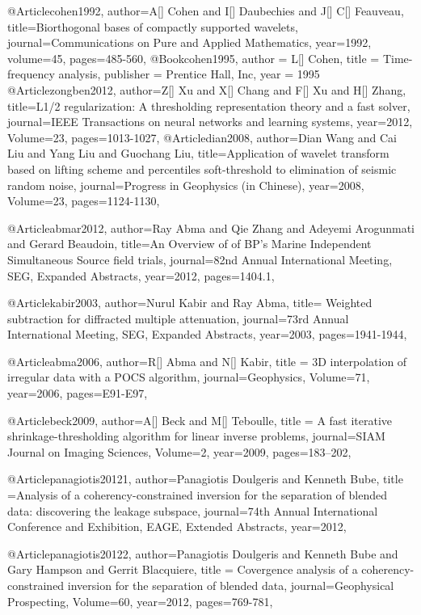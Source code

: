 @Article{cohen1992,
  author={A[] Cohen and I[] Daubechies and J[] C[] Feauveau},
  title={Biorthogonal bases of compactly supported wavelets},
  journal={Communications on Pure and Applied Mathematics},
  year=1992,
  volume=45,
  pages={485-560},
}
@Book{cohen1995,
  author = 	 {L[] Cohen},
  title = 	 { Time-frequency analysis},
  publisher = 	 {Prentice Hall, Inc},
  year = 	 1995}
@Article{zongben2012,
  author={Z[] Xu and X[] Chang and F[] Xu and H[] Zhang},
  title={L1/2 regularization: A thresholding representation theory and a fast solver},
  journal={IEEE Transactions on neural networks and learning systems},
  year=2012,
  Volume=23,
  pages={1013-1027},
}
@Article{dian2008,
  author={Dian Wang and Cai Liu and Yang Liu and Guochang Liu},
  title={Application of wavelet transform based on lifting scheme and percentiles soft-threshold to elimination of seismic random noise},
  journal={Progress in Geophysics (in Chinese)},
  year=2008,
  Volume=23,
  pages={1124-1130},
}


@Article{abmar2012,
  author={Ray Abma and Qie Zhang and Adeyemi Arogunmati and Gerard Beaudoin},
  title={An Overview of of {BP}'s Marine Independent Simultaneous Source field trials},
  journal={82nd Annual International Meeting, SEG, Expanded Abstracts},
  year=2012,
  pages={1404.1},
}

@Article{kabir2003,
  author={Nurul Kabir and Ray Abma},
  title={	Weighted subtraction for diffracted multiple attenuation},
  journal={73rd Annual International Meeting, SEG, Expanded Abstracts},
  year=2003,
  pages={1941-1944},
}

@Article{abma2006,
  author={R[] Abma and N[] Kabir},
  title = {3{D} interpolation of irregular data with a {POCS} algorithm},
  journal={Geophysics},
  Volume=71,
  year=2006,
  pages={E91-E97},
}

@Article{beck2009,
  author={A[] Beck and M[] Teboulle},
  title = {A fast iterative shrinkage-thresholding algorithm for
linear inverse problems},
  journal={SIAM Journal on Imaging Sciences},
  Volume=2,
  year=2009,
  pages={183–202},
}

@Article{panagiotis20121,
  author={Panagiotis Doulgeris and Kenneth Bube},
  title ={Analysis of a coherency-constrained inversion for the separation of blended data: discovering the leakage subspace},
  journal={74th Annual International Conference and Exhibition, EAGE, Extended Abstracts},
  year=2012,
  }

@Article{panagiotis20122,
  author={Panagiotis Doulgeris and Kenneth Bube and Gary Hampson and Gerrit Blacquiere},
  title = {Covergence analysis of a coherency-constrained inversion for the separation of blended data},
  journal={Geophysical Prospecting},
  Volume=60,
  year=2012,
  pages={769-781},
}

